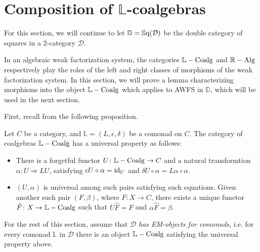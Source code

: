 
\chapter{Composition of $\mathbb{L}$-coalgebras}

For this section, we will continue to let $\mathbb{D}=\mathbb{S}\mathrm{q}(\mathcal{D})$ be the double category of squares in a 2-category $\mathcal{D}$.

In an algebraic weak factorization system, the categories $\mathbb{L}-\mathrm{Coalg}$ and $\mathbb{R}-\mathrm{Alg}$ respectively play the roles of the left and right classes of morphisms of the weak factorization system. In this section, we will prove a lemma characterizing morphisms into the object $\mathbb{L}-\mathrm{Coalg}$ which applies to AWFS in $\mathbb{D}$, which will be used in the next section.

First, recall from \cite{street:ftm} the following proposition.

\begin{proposition}\label{Prop:EMObject}
	Let $C$ be a category, and $\mathbb{L}=(L,\epsilon,\delta)$ be a comonad on $C$. The category of coalgebras $\mathbb{L}-\mathrm{Coalg}$ has a universal property as follows:
	\begin{itemize}
	 	\item There is a forgetful functor $U\colon \mathbb{L}-\mathrm{Coalg} \to C$ and a natural transformtion $\alpha\colon U \Rightarrow LU$, satisfying $\epsilon U\circ\alpha = \operatorname{id}_U$ and $\delta U \circ \alpha = L\alpha\circ\alpha$.
	 	\item $(U,\alpha)$ is universal among such pairs satisfying such equations. Given another such pair $(F,\beta)$, where $F\colon X\to C$, there exists a unique functor $\hat{F}\colon X\to \mathbb{L}-\mathrm{Coalg}$ such that $U\hat{F}=F$ and $\alpha\hat{F}=\beta$.
	 \end{itemize} 
\end{proposition}

For the rest of this section, assume that $\mathcal{D}$ \emph{has EM-objects for comonads}, i.e. for every comonad $\mathbb{L}$ in $\mathcal{D}$ there is an object $\mathbb{L}-\mathrm{Coalg}$ satisfying the universal property above.

